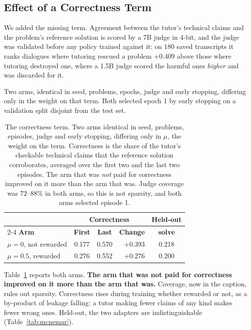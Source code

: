 \documentclass[conference]{IEEEtran}
\begin{document}
\subsection{Effect of a Correctness Term}
\label{sec:correctness}

We added the missing term. Agreement between the tutor's technical claims and
the problem's reference solution is scored by a 7B judge in 4-bit, and the
judge was validated before any policy trained against it: on $180$ saved
transcripts it ranks dialogues where tutoring rescued a problem $+0.409$ above
those where tutoring destroyed one, where a 1.5B judge scored the harmful ones
\emph{higher} and was discarded for it.

Two arms, identical in seed, problems, epochs, judge and early stopping,
differing only in the weight on that term. Both selected epoch 1 by early
stopping on a validation split disjoint from the test set.

\begin{table}[t]
\caption{The correctness term. Two arms identical in seed, problems, episodes,
judge and early stopping, differing only in $\mu$, the weight on the term.
Correctness is the share of the tutor's checkable technical claims that the
reference solution corroborates, averaged over the first two and the last two
episodes. The arm that was \emph{not} paid for correctness improved on it more
than the arm that was. Judge coverage was $72$--$88\%$ in both arms, so this is
not sparsity, and both arms selected episode 1.}
\label{tab:correctness}
\centering
\small
\begin{tabular}{lccrc}
\toprule
 & \multicolumn{3}{c}{\textbf{Correctness}} & \textbf{Held-out} \\
\cmidrule(lr){2-4}
\textbf{Arm} & \textbf{First} & \textbf{Last} & \textbf{Change} &
\textbf{solve} \\
\midrule
$\mu{=}0$, not rewarded   & 0.177 & 0.570 & $\mathbf{+0.393}$ & 0.218 \\
$\mu{=}0.5$, rewarded     & 0.276 & 0.552 & $+0.276$          & 0.200 \\
\bottomrule
\end{tabular}
\end{table}

Table~\ref{tab:correctness} reports both arms.
\textbf{The arm that was not paid for correctness improved on it more than the
arm that was.} Coverage, now in the caption, rules out sparsity.
Correctness rises during training whether rewarded or not, as a by-product of
leakage falling: a tutor making fewer claims of any kind makes fewer wrong
ones. Held-out, the two adapters are indistinguishable
(Table~\ref{tab:mcnemar}).
\end{document}
